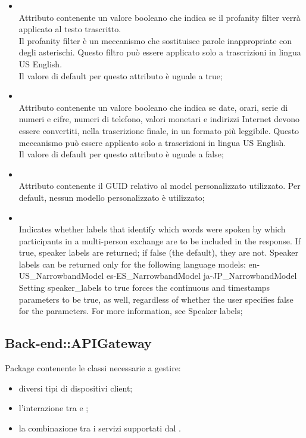 \begin{itemize}
\begin{itemize}
		\item[]  \\
		Attributo contenente un valore booleano che indica se il profanity filter verrà applicato al testo trascritto. \\
Il profanity filter è un meccanismo che sostituisce parole inappropriate con degli asterischi. Questo filtro può essere applicato solo a trascrizioni in lingua US English. \\
Il valore di default per questo attributo è uguale a true;
		\item[]  \\
		Attributo contenente un valore booleano che indica se date, orari, serie di numeri e cifre, numeri di telefono, valori monetari e indirizzi Internet devono essere convertiti, nella trascrizione finale, in un formato più leggibile. Questo meccanismo può essere applicato solo a trascrizioni in lingua US English. \\
Il valore di default per questo attributo è uguale a false;
		\item[]  \\
		Attributo contenente il GUID relativo al model personalizzato utilizzato. Per default, nessun modello personalizzato è utilizzato;
		\item[]  \\
		Indicates whether labels that identify which words were spoken by which participants in a multi-person exchange are to be included in the response. If true, speaker labels are returned; if false (the default), they are not. Speaker labels can be returned only for the following language models:
en-US\_NarrowbandModel
es-ES\_NarrowbandModel
ja-JP\_NarrowbandModel
Setting speaker\_labels to true forces the continuous and timestamps parameters to be true, as well, regardless of whether the user specifies false for the parameters. For more information, see Speaker labels;
	\end{itemize}
\end{itemize}
\FloatBarrier

\subsection{Back-end::APIGateway}
Package contenente le classi necessarie a gestire:
\begin{itemize}
 \item diversi tipi di  dispositivi client;
 \item l'interazione tra  e ;
 \item la combinazione tra i servizi supportati dal .
\end{itemize}

